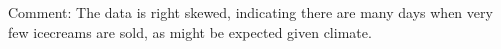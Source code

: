 \documentclass[bigtut]{tutorial}\usepackage[]{graphicx}\usepackage[]{color}
\newenvironment{knitrout}{}{} %
\begin{document}
\begin{tutorial}
\begin{questions}
\begin{solution}
\begin{knitrout}
\end{knitrout}

Comment: The data is right skewed, indicating there are many days when very few icecreams are sold, as might be expected given climate. 

\end{solution}

\end{questions}
\end{tutorial}
\end{document}
